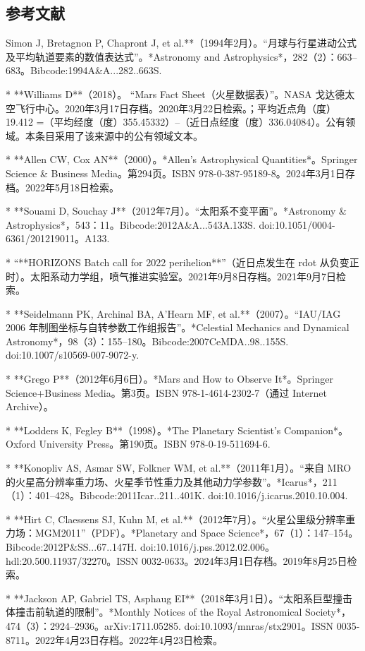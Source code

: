 \subsection{参考文献}

Simon J, Bretagnon P, Chapront J, et al.**（1994年2月）。“月球与行星进动公式及平均轨道要素的数值表达式”。*Astronomy and Astrophysics*，282（2）：663–683。Bibcode:1994A&A...282..663S.

* **Williams D**（2018）。 “Mars Fact Sheet（火星数据表）”。NASA 戈达德太空飞行中心。2020年3月17日存档。2020年3月22日检索。；平均近点角（度）19.412 =（平均经度（度）355.45332）–（近日点经度（度）336.04084）。公有领域。本条目采用了该来源中的公有领域文本。

* **Allen CW, Cox AN**（2000）。*Allen's Astrophysical Quantities*。Springer Science & Business Media。第294页。ISBN 978-0-387-95189-8。2024年3月1日存档。2022年5月18日检索。

* **Souami D, Souchay J**（2012年7月）。“太阳系不变平面”。*Astronomy & Astrophysics*，543：11。Bibcode:2012A&A...543A.133S. doi:10.1051/0004-6361/201219011。A133.

* “**HORIZONS Batch call for 2022 perihelion**”（近日点发生在 rdot 从负变正时）。太阳系动力学组，喷气推进实验室。2021年9月8日存档。2021年9月7日检索。

* **Seidelmann PK, Archinal BA, A'Hearn MF, et al.**（2007）。“IAU/IAG 2006 年制图坐标与自转参数工作组报告”。*Celestial Mechanics and Dynamical Astronomy*，98（3）：155–180。Bibcode:2007CeMDA..98..155S. doi:10.1007/s10569-007-9072-y.

* **Grego P**（2012年6月6日）。*Mars and How to Observe It*。Springer Science+Business Media。第3页。ISBN 978-1-4614-2302-7（通过 Internet Archive）。

* **Lodders K, Fegley B**（1998）。*The Planetary Scientist's Companion*。Oxford University Press。第190页。ISBN 978-0-19-511694-6.

* **Konopliv AS, Asmar SW, Folkner WM, et al.**（2011年1月）。“来自 MRO 的火星高分辨率重力场、火星季节性重力及其他动力学参数”。*Icarus*，211（1）：401–428。Bibcode:2011Icar..211..401K. doi:10.1016/j.icarus.2010.10.004.

* **Hirt C, Claessens SJ, Kuhn M, et al.**（2012年7月）。“火星公里级分辨率重力场：MGM2011”（PDF）。*Planetary and Space Science*，67（1）：147–154。Bibcode:2012P&SS...67..147H. doi:10.1016/j.pss.2012.02.006。hdl:20.500.11937/32270。ISSN 0032-0633。2024年3月1日存档。2019年8月25日检索。

* **Jackson AP, Gabriel TS, Asphaug EI**（2018年3月1日）。“太阳系巨型撞击体撞击前轨道的限制”。*Monthly Notices of the Royal Astronomical Society*，474（3）：2924–2936。arXiv:1711.05285. doi:10.1093/mnras/stx2901。ISSN 0035-8711。2022年4月23日存档。2022年4月23日检索。

